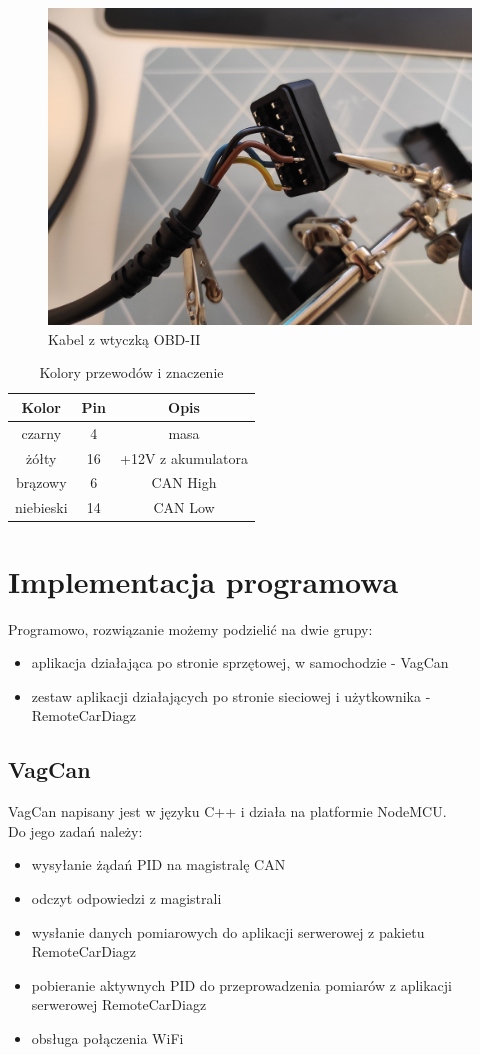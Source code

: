 \documentclass[10pt,a4paper]{scrartcl}
\begin{document}
		\begin{figure}[H]
			\centering
			\includegraphics[width=0.7\linewidth]{kabel_obd_2}
			\caption[Kabel z wtyczką OBD-II]{Kabel z wtyczką OBD-II}
			\label{fig:kabelobd2}
		\end{figure}
		
			\begin{table}[H]
			\caption{Kolory przewodów i znaczenie}
			\begin{tabular}{|c|c|c|}
				\hline
				Kolor & Pin & Opis \\
				\hline
				czarny & 4 & masa \\
				\hline
				żółty & 16 & +12V z akumulatora \\
				\hline
				brązowy &6 & CAN High \\			
				\hline
				niebieski &14 & CAN Low \\			
				\hline
			\end{tabular}
		\end{table}
	
	
	\section{Implementacja programowa}
	Programowo, rozwiązanie możemy podzielić na dwie grupy:
		\begin{itemize}
			\item aplikacja działająca po stronie sprzętowej, w samochodzie - VagCan
			\item zestaw aplikacji działających po stronie sieciowej i użytkownika - RemoteCarDiagz
		\end{itemize}
		\subsection{VagCan}
		VagCan napisany jest w języku C++ i działa na platformie NodeMCU.\\
		Do jego zadań należy:
		\begin{itemize}
			\item wysyłanie żądań PID na magistralę CAN
			\item odczyt odpowiedzi z magistrali
			\item wysłanie danych pomiarowych do aplikacji serwerowej z pakietu RemoteCarDiagz
			\item pobieranie aktywnych PID do przeprowadzenia pomiarów z aplikacji serwerowej RemoteCarDiagz
			\item obsługa połączenia WiFi
		\end{itemize}
\end{document}
